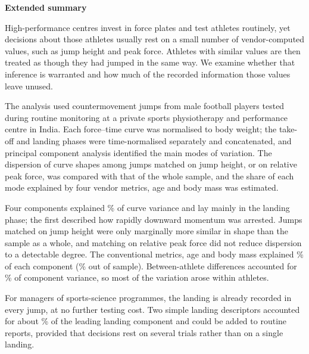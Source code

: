 \noindent\textbf{Extended summary}\par\smallskip
High-performance centres invest in force plates and test athletes routinely, yet decisions about those athletes usually rest on a small number of vendor-computed values, such as jump height and peak force. Athletes with similar values are then treated as though they had jumped in the same way. We examine whether that inference is warranted and how much of the recorded information those values leave unused.

The analysis used \nTrials{} countermovement jumps from \nAth{} male football players tested during routine monitoring at a private sports physiotherapy and performance centre in India. Each force--time curve was normalised to body weight; the take-off and landing phases were time-normalised separately and concatenated, and principal component analysis identified the main modes of variation. The dispersion of curve shapes among jumps matched on jump height, or on relative peak force, was compared with that of the whole sample, and the share of each mode explained by four vendor metrics, age and body mass was estimated.

Four components explained \cumFour\% of curve variance and lay mainly in the landing phase; the first described how rapidly downward momentum was arrested. Jumps matched on jump height were only marginally more similar in shape than the sample as a whole, and matching on relative peak force did not reduce dispersion to a detectable degree. The conventional metrics, age and body mass explained \rtwoRange\% of each component (\cvRange\% out of sample). Between-athlete differences accounted for \betweenRange\% of component variance, so most of the variation arose within athletes.

For managers of sports-science programmes, the landing is already recorded in every jump, at no further testing cost. Two simple landing descriptors accounted for about \landRtwoPCA\% of the leading landing component and could be added to routine reports, provided that decisions rest on several trials rather than on a single landing.
